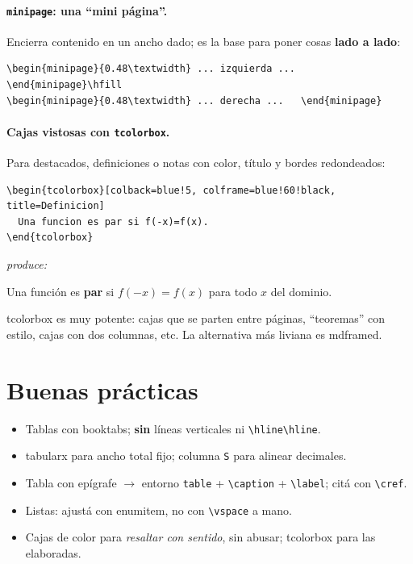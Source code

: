\documentclass[11pt,a4paper]{article}
\newcommand{\C}[1]{\texttt{\textbackslash #1}}
\newcommand{\pkg}[1]{\textsf{#1}}
\newcommand{\produce}{\par\smallskip\noindent\textit{produce:}\par\smallskip}
\begin{document}
\paragraph{\texttt{minipage}: una \enquote{mini página}.} Encierra contenido en un
ancho dado; es la base para poner cosas \textbf{lado a lado}:
\begin{lstlisting}
\begin{minipage}{0.48\textwidth} ... izquierda ... \end{minipage}\hfill
\begin{minipage}{0.48\textwidth} ... derecha ...   \end{minipage}
\end{lstlisting}

\paragraph{Cajas vistosas con \texttt{tcolorbox}.} Para destacados, definiciones o
notas con color, título y bordes redondeados:
\begin{lstlisting}
\begin{tcolorbox}[colback=blue!5, colframe=blue!60!black, title=Definicion]
  Una funcion es par si f(-x)=f(x).
\end{tcolorbox}
\end{lstlisting}
\produce
\begin{tcolorbox}[colback=blue!5,colframe=blue!60!black,title=Definición,
                  fonttitle=\bfseries]
  Una función es \textbf{par} si $f(-x)=f(x)$ para todo $x$ del dominio.
\end{tcolorbox}
\noindent \pkg{tcolorbox} es muy potente: cajas que se parten entre páginas,
\enquote{teoremas} con estilo, cajas con dos columnas, etc. La alternativa más
liviana es \pkg{mdframed}.

\section{Buenas prácticas}
\begin{itemize}[noitemsep,leftmargin=*]
  \item Tablas con \pkg{booktabs}; \textbf{sin} líneas verticales ni
        \C{hline}\C{hline}.
  \item \pkg{tabularx} para ancho total fijo; columna \texttt{S} para alinear
        decimales.
  \item Tabla con epígrafe $\to$ entorno \texttt{table} + \C{caption} + \C{label};
        citá con \C{cref}.
  \item Listas: ajustá con \pkg{enumitem}, no con \C{vspace} a mano.
  \item Cajas de color para \emph{resaltar con sentido}, sin abusar; \pkg{tcolorbox}
        para las elaboradas.
\end{itemize}
\end{document}
